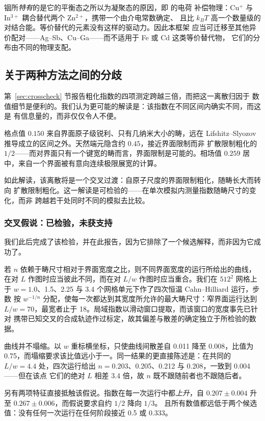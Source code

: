 \documentclass[11pt,a4paper]{ctexart}
\begin{document}
铟所\emph{特有}的是它的平衡态之所以为凝聚态的原因，即 \citet{yu2026} 的电荷
补偿物理：Cu$^+$ 与 In$^{3+}$ 耦合替代两个 Zn$^{2+}$，携带一个由介电常数确定、
且比 $k_BT$ 高一个数量级的对结合能。等价替代的元素没有这样的驱动力。因此本框架
应当可迁移至其他异价配对——Ag--Sb、Cu--Ga——而不适用于 Fe 或 Cd 这类等价替代物，
它们的分布由不同的物理支配。

\subsection{关于两种方法之间的分歧}

第~\ref{sec:crosscheck} 节报告粗化指数的四项测定跨越三倍，而把这一离散归因于
数值细节是便利的。我们认为更可能的解读是：该指数在不同区间内确实不同，而这是
有信息量的，而非仅仅令人不便。

格点值 $0.150$ 来自界面原子级锐利、只有几纳米大小的畴，远在
Lifshitz--Slyozov 推导成立的区间之外。天然端元隐含约 $0.45$，接近界面限制而非
扩散限制粗化的 $1/2$——而对界面只有一个键宽的畴而言，界面限制是可能的。相场值
$0.259$ 居中，来自一个界面被有意向连续极限展宽的计算。

如此解读，该离散将是一个交叉过渡：自原子尺度的界面限制粗化，随畴长大而转向
扩散限制粗化。这一解读是可检验的——在单次模拟内测量指数随畴尺寸的变化，而非
跨越若干处同时不同的模拟去比较。

\subsubsection*{交叉假说：已检验，未获支持}

我们此后完成了该检验，并在此报告，因为它排除了一个候选解释，而非因为它成功了。

若 $n$ 依赖于畴尺寸相对于界面宽度之比，则不同界面宽度的运行所给出的曲线，在对
$L$ 作图时应当彼此不同，而在对 $L/w$ 作图时应当重合。我们在 $512^2$ 网格上于
$w = 1.0$、1.5、2.25 与 3.4 个网格单元下作了四次恒温 Cahn--Hilliard 运行，步数
按 $w^{-1/n}$ 分配，使每一次都达到其宽度所允许的最大畴尺寸：窄界面运行达到
$L/w = 70$，最宽者止于 18。局域指数以滑动窗口提取，而该窗口的宽度事先已针对
携带已知交叉的合成轨迹作过标定，故其偏差与散差的确定独立于所检验的数据。

曲线并不塌缩。以 $w$ 重标横坐标，只使曲线间散差自 0.011 降至 0.008，比值为
0.75，而塌缩要求该比值远小于一。同一结果的更直接陈述是：在共同的 $L/w = 4.4$
处，四次运行给出 $n = 0.203$、0.205、0.212 与 0.208，一致到 0.004——但在该点
它们的绝对 $L$ 相差 3.4 倍，故 $n$ 既不跟随前者也不跟随后者。

另有两项特征直接抵触该假说。指数在每一次运行中都\emph{上升}，自
$0.207 \pm 0.004$ 升至 $0.267 \pm 0.006$，而假说要求自约 $1/2$ 降向 $1/3$。
且所有数值都远低于两个候选值：没有任何一次运行在任何阶段接近 0.5 或 0.333。
\end{document}
